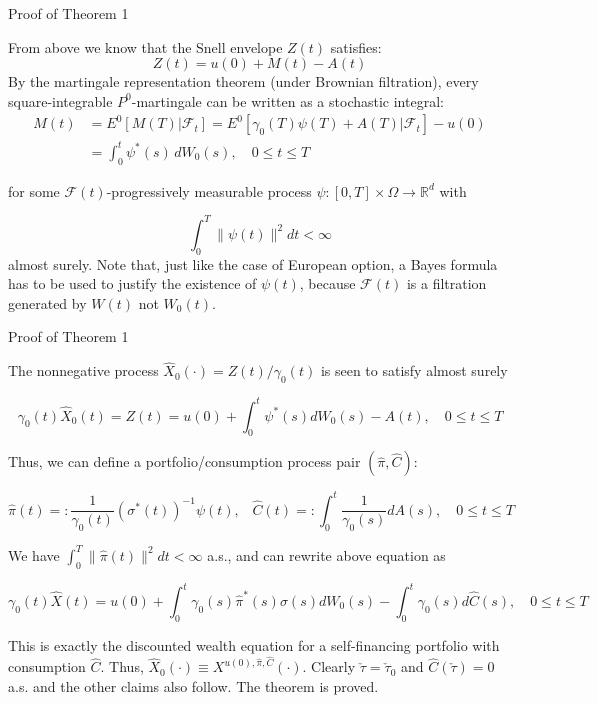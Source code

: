 \documentclass{beamer}
\begin{document}
\begin{frame}{Proof of Theorem 1}

    {\footnotesize \footnotesize
    From above we know that the Snell envelope \( Z(t) \) satisfies:
    \[
    Z(t) = u(0) + M(t) - A(t)
    \]
    By the martingale representation theorem (under Brownian filtration), every square-integrable \( P^0\)-martingale can be written as a stochastic integral:
    \begin{align*}
        M(t) &= E^0[M(T)|\mathcal{F}_t] = E^0[\gamma_0(T)\psi(T) + A(T)|\mathcal{F}_t] - u(0)\\
    &= \int_0^t \psi^*(s) \, dW_0(s), \quad 0 \leq t \leq T
    \end{align*}

    \pause  for some \( \mathcal{F}(t) \)-progressively measurable process 
    \( \psi : [0,T] \times \Omega \to \mathbb{R}^d \) with

    \[
    \int_0^T \|\psi(t)\|^2 dt < \infty
    \]
    almost surely. Note that, just like the case of European option, a Bayes formula has to be used to justify
     the existence of \(\psi(t)\), because \(\mathcal{F}(t) \) is a filtration generated by \(W(t)\) not \(W_0(t)\).


    }

    
\end{frame}

\begin{frame}{Proof of Theorem 1}

    {\footnotesize \footnotesize
    The nonnegative process \(\hat{X}_0(\cdot) = Z(t)/\gamma_0(t)\)  is seen to satisfy almost surely

    \[
    \gamma_0(t)\hat{X}_0(t) = Z(t) = u(0) + \int_0^t \psi^*(s)dW_0(s) - A(t), \quad 0 \leq t \leq T
    \]
    
    Thus, we can define a portfolio/consumption process pair \((\hat{\pi}, \hat{C})\):

    \[
    \hat{\pi}(t) =: \frac{1}{\gamma_0(t)} (\sigma^*(t))^{-1} \psi(t),\;\;\;\hat{C}(t) =: \int_0^t \frac{1}{\gamma_0(s)} dA(s), \quad 0 \leq t \leq T
    \]


     \pause We have \(\int_0^T \|\hat{\pi}(t)\|^2 dt < \infty\) a.s., and can rewrite above equation as

    \[
    \gamma_0(t)\hat{X}(t) = u(0) + \int_0^t \gamma_0(s) \hat{\pi}^*(s) \sigma(s) dW_0(s) 
    - \int_0^t \gamma_0(s) d\hat{C}(s), \quad 0 \leq t \leq T
    \]

    This is exactly the discounted wealth equation for a self-financing portfolio with consumption 
    $\hat{C}$. Thus, \(\hat{X}_0(\cdot) \equiv X^{u(0), \hat{\pi}, \hat{C}}(\cdot)\). Clearly
     \(\check{\tau} = \check{\tau}_0\) and \(\hat{C}(\check{\tau}) = 0\) a.s. and 
     the other claims also follow. The theorem is proved.
    }

    
\end{frame}
\end{document}
